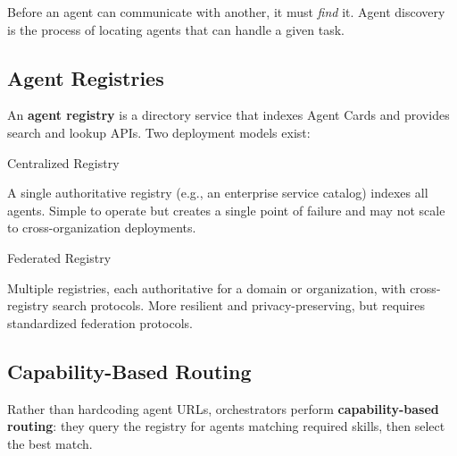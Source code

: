 Before an agent can communicate with another, it must \emph{find} it. Agent discovery is the process of locating agents that can handle a given task.

\subsection{Agent Registries}
\label{agent-registries}

An \textbf{agent registry} is a directory service that indexes Agent Cards and provides search and lookup APIs. Two deployment models exist:

Centralized Registry

A single authoritative registry (e.g., an enterprise service catalog) indexes all agents. Simple to operate but creates a single point of failure and may not scale to cross-organization deployments.

Federated Registry

Multiple registries, each authoritative for a domain or organization, with cross-registry search protocols. More resilient and privacy-preserving, but requires standardized federation protocols.

\subsection{Capability-Based Routing}
\label{capability-based-routing}

Rather than hardcoding agent URLs, orchestrators perform \textbf{capability-based routing}: they query the registry for agents matching required skills, then select the best match.

